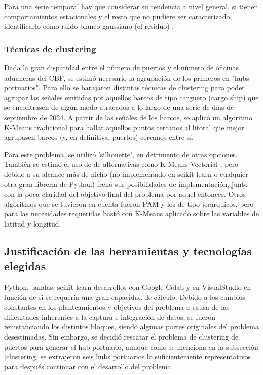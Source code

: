 \documentclass[12pt]{article}
\begin{document}
		Para una serie temporal hay que considerar su tendencia a nivel general, si tienen comportamientos estacionales y el resto que no pudiere ser caracterizado, identificarlo como ruido blanco gaussiano (el residuo) \cite{}.
		

		\subsubsection{\label{clustering}Técnicas de clustering}
		Dada la gran disparidad entre el número de puertos y el número de oficinas aduaneras del CBP, se estimó necesario la agrupación de los primeros en "hubs portuarios". Para ello se barajaron distintas técnicas de clustering para poder agrupar las señales emitidas por aquellos barcos de tipo carguero (cargo ship) que se encontrasen de algún modo atracados a lo largo de una serie de días de septiembre de 2024. A partir de las señales de los barcos, se aplicó un algoritmo K-Means tradicional para hallar aquellos puntos cercanos al litoral que mejor agrupasen barcos (y, en definitiva, puertos) cercanos entre sí.
		
		Para este problema, se utilizó 'silhouette', en detrimento de otras opciones. También se estimó el uso de de alternativas como K-Means Vectorial \cite[]{https://arxiv.org/abs/1208.5801}, pero debido a su alcance más de nicho (no implementado en scikit-learn o cualquier otra gran librería de Python) frenó sus posibilidades de implementación, junto con la poca claridad del objetivo final del problema por aquel entonces. Otros algoritmos que se tuvieron en cuenta fueron PAM y los de tipo jerárquicos, pero para las necesidades requeridas bastó con K-Means aplicado sobre las variables de latitud y longitud.	
		
	\subsection{Justificación de las herramientas y tecnologías elegidas}
	Python, pandas, scikit-learn desarrollos con Google Colab y en VisualStudio en función de si se requería una gran capacidad de cálculo. Debido a los cambios constantes en los planteamientos y objetivos del problema a causa de las dificultades inherentes a la captura e integración de datos, se fueron reinstanciando los distintos bloques, siendo algunas partes originales del problema desestimadas. Sin embargo, se decidió rescatar el problema de clustering de puertos para generar el hub portuario, aunque como se menciona en la subsección \ref{clustering} se extrajeron seis hubs portuarios lo suficientemente representativos para después continuar con el desarrollo del problema.
	
\end{document}
